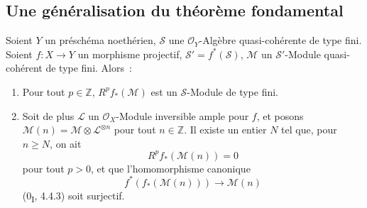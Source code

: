 \subsection{Une généralisation du théorème fondamental}
\label{subsection:III.2.4-fr}

\begin{theorem}[2.4.1]
\label{III.2.4.1-fr}
Soient $Y$ un préschéma noethérien, $\mathcal S$ une
$\mathcal O_Y$-Algèbre quasi-cohérente de type fini. Soient
$f:X\to Y$ un morphisme projectif, $\mathcal S'=f^*(\mathcal S)$,
$\mathcal M$ un $\mathcal S'$-Module quasi-cohérent de type fini.
Alors~:
\begin{enumerate}
\item[(i)] Pour tout $p\in\mathbb Z$, $R^pf_*(\mathcal M)$ est un
$\mathcal S$-Module de type fini.
\item[(ii)] Soit de plus $\mathcal L$ un $\mathcal O_X$-Module inversible
ample pour $f$, et posons
$\mathcal M(n)=\mathcal M\otimes\mathcal L^{\otimes n}$ pour tout
$n\in\mathbb Z$. Il existe un entier $N$ tel que, pour $n\geq N$, on ait
\[
R^pf_*(\mathcal M(n))=0
\tag{2.4.1.1}\label{III.2.4.1.1-fr}
\]
pour tout $p>0$, et que l'homomorphisme canonique
\[
f^*(f_*(\mathcal M(n)))\longrightarrow\mathcal M(n)
\]
(0\textsubscript{I}, 4.4.3) soit surjectif.
\end{enumerate}
\end{theorem}

